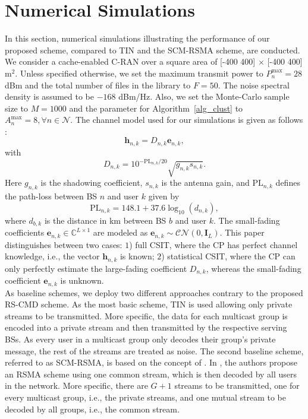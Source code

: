 \documentclass[12pt,draftcls,onecolumn]{IEEEtran}
\theoremstyle{remark}
\theoremstyle{definition}
\begin{document}
{\section{Numerical Simulations} \label{sec:NS}
In this section, numerical simulations illustrating the performance of our proposed scheme, compared to TIN and the SCM-RSMA scheme, are conducted. We consider a cache-enabled C-RAN over a square area of [-400 400] $\times$ [-400 400] $\text{m}^2$. Unless specified otherwise, we set the maximum transmit power to $P_n^{\text{max}} = 28$ dBm and the total number of files in the library to $F=50$. The noise spectral density is assumed to be $-168$ dBm/Hz. Also, we set the Monte-Carlo sample size to $M=1000$ and the parameter for Algorithm~\ref{alg_clust} to $A_n^{\text{max}}=8,\forall n\in\mathcal{N}$. The channel model used for our simulations is given as follows \cite{6786060}:
\begin{equation}
	\mathbf{h}_{n,k} = 	D_{n,k}\mathbf{e}_{n,k},
\end{equation}
with
\begin{equation}
	D_{n,k} = 10^{-\text{PL}_{n,k}/20}\sqrt{g_{n,k}s_{n,k}}.
\end{equation}
Here $g_{n,k}$ is the shadowing coefficient, $s_{n,k}$ is the antenna gain, and $\text{PL}_{n,k}$ defines the path-loss between BS $n$ and user $k$ given by
\begin{equation}
	\text{PL}_{n,k} = 148.1 + 37.6\log_{10}(d_{n,k}),
\end{equation}
where $d_{b,k}$ is the distance in km between BS $b$ and user $k$. The small-fading coefficients $\mathbf{e}_{n,k}\in\mathbb{C}^{L\times 1}$ are modeled as $\mathbf{e}_{n,k}\sim \mathbf{\mathcal{CN}}\left(0, \mathbf{I}_{L}\right)$. This paper distinguishes between two cases: $1$) full CSIT, where the CP has perfect channel knowledge, i.e., the vector $\mathbf{h}_{n,k}$ is known; $2$) statistical CSIT, where the CP can only perfectly estimate the large-fading coefficient $D_{n,k}$, whereas the small-fading coefficient $\mathbf{e}_{n,k}$ is unknown. \\
\indent As baseline schemes, we deploy two different approaches contrary to the proposed RS-CMD scheme. As the most basic scheme, TIN is used allowing only private streams to be transmitted. More specific, the data for each multicast group is encoded into a private stream and then transmitted by the respective serving BSs. As every user in a multicast group only decodes their group's private message, the rest of the streams are treated as noise. The second baseline scheme, referred to as SCM-RSMA, is based on the concept of \cite{7555358}. In \cite{7555358}, the authors propose an RSMA scheme using one common stream, which is then decoded by all users in the network. More specific, there are $G+1$ streams to be transmitted, one for every multicast group, i.e., the private streams, and one mutual stream to be decoded by all groups, i.e., the common stream.
}
\end{document}
